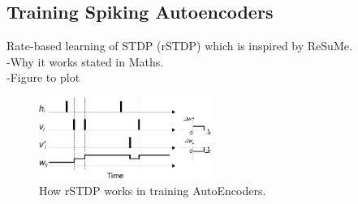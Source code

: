 \documentclass[conference]{IEEEtran}
\begin{document}
\subsection{Training Spiking Autoencoders}
Rate-based learning of STDP (rSTDP) which is inspired by ReSuMe.\\
-Why it works stated in Maths.\\
-Figure to plot
	\begin{figure}
		\centering
		\includegraphics[width=0.5\textwidth]{rSTDP}
		\caption{How rSTDP works in training AutoEncoders.}
		\label{fig:rSTDP}
	\end{figure}
\end{document}
